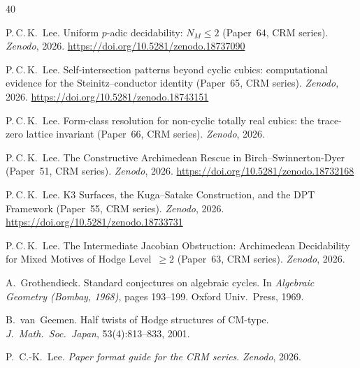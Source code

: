 \documentclass[11pt]{article}
\theoremstyle{plain}
\theoremstyle{definition}
\theoremstyle{remark}
\begin{document}
\begin{thebibliography}{40}

P.\,C.\,K.~Lee.
Uniform $p$-adic decidability: $N_M \le 2$
(Paper~64, CRM series).
\textit{Zenodo}, 2026.
\url{https://doi.org/10.5281/zenodo.18737090}

P.\,C.\,K.~Lee.
Self-intersection patterns beyond cyclic cubics:
computational evidence for the Steinitz--conductor identity
(Paper~65, CRM series).
\textit{Zenodo}, 2026.
\url{https://doi.org/10.5281/zenodo.18743151}

P.\,C.\,K.~Lee.
Form-class resolution for non-cyclic totally real cubics:
the trace-zero lattice invariant
(Paper~66, CRM series).
\textit{Zenodo}, 2026.

P.\,C.\,K.~Lee.
The Constructive Archimedean Rescue in Birch--Swinnerton-Dyer
(Paper~51, CRM series).
\textit{Zenodo}, 2026.
\url{https://doi.org/10.5281/zenodo.18732168}

P.\,C.\,K.~Lee.
K3 Surfaces, the Kuga--Satake Construction, and the DPT Framework
(Paper~55, CRM series).
\textit{Zenodo}, 2026.
\url{https://doi.org/10.5281/zenodo.18733731}

P.\,C.\,K.~Lee.
The Intermediate Jacobian Obstruction: Archimedean Decidability
for Mixed Motives of Hodge Level~$\ge 2$
(Paper~63, CRM series).
\textit{Zenodo}, 2026.

A.~Grothendieck.
Standard conjectures on algebraic cycles.
In \textit{Algebraic Geometry (Bombay, 1968)}, pages 193--199.
Oxford Univ.\ Press, 1969.

B.~van~Geemen.
Half twists of Hodge structures of CM-type.
\textit{J.\ Math.\ Soc.\ Japan}, 53(4):813--833, 2001.

P.~C.-K.~Lee.
\emph{Paper format guide for the CRM series}.
\textit{Zenodo}, 2026.

\end{thebibliography}
\end{document}
